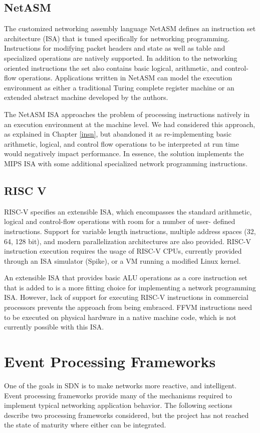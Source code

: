 \subsection{NetASM}
\label{related:netasm}
The customized networking assembly language NetASM \cite{netasm} defines an
instruction set architecture (ISA) that is tuned specifically for networking
programming. Instructions for modifying packet headers and state as well
as table and specialized operations are natively supported. In addition to the
networking oriented instructions the set also contains basic logical,
arithmetic, and control-flow operations. Applications written in NetASM can
model the execution environment as either a traditional Turing complete
register machine or an extended abstract machine developed by the authors.

The NetASM ISA approaches the problem of processing instructions natively in an
execution environment at the machine level. We had considered this approach,
as explained in Chapter \ref{insn}, but abandoned it as re-implementing
basic arithmetic, logical, and control flow operations to be interpreted at
run time would negatively impact performance. In essence, the solution
implements the MIPS ISA with some additional specialized network programming
instructions.

\subsection{RISC V}
\label{related:riscv}
RISC-V \cite{riscv} specifies an extensible ISA, which encompasses the standard
arithmetic, logical and control-flow operations with room for a number of user-
defined instructions. Support for variable length instructions, multiple
address spaces (32, 64, 128 bit), and modern parallelization architectures are
also provided. RISC-V instruction execution requires the usage of RISC-V CPUs,
currently provided through an ISA simulator (Spike), or a VM running a modified
Linux kernel.

An extensible ISA that provides basic ALU operations as a core instruction set
that is added to is a more fitting choice for implementing a network programming
ISA. However, lack of support for executing RISC-V instructions in commercial
processors prevents the approach from being embraced. FFVM instructions need to
be executed on physical hardware in a native machine code, which is not
currently possible with this ISA.

\section{Event Processing Frameworks}
\label{related:event}
One of the goals in SDN is to make networks more reactive, and intelligent.
Event processing frameworks provide many of the mechanisms required to implement
typical networking application behavior. The following sections describe two
processing frameworks considered, but the project has not reached the state
of maturity where either can be integrated.

